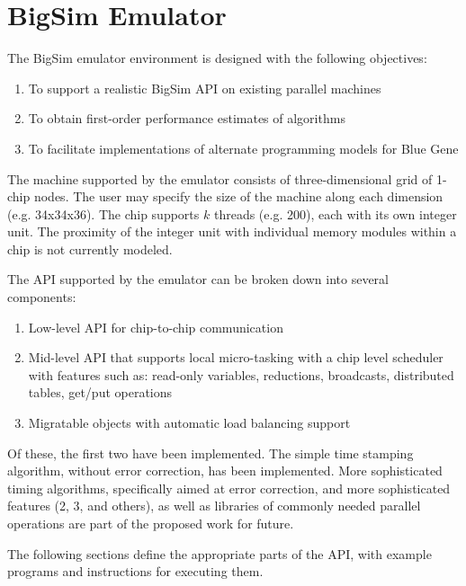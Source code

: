 
\section{BigSim Emulator}
\label{bgemulator}

The BigSim emulator environment is designed with the following
objectives:

\begin{enumerate}
\item To support a realistic BigSim API on existing parallel machines

\item To obtain first-order performance estimates of algorithms

\item To facilitate implementations of alternate programming models for
      Blue Gene
\end{enumerate}

The machine supported by the emulator consists of three-dimensional grid of
1-chip nodes.  The user may specify the size of the machine along each
dimension (e.g. 34x34x36).  The chip supports $k$ threads (e.g. 200), each with
its own integer unit.  The proximity of the integer unit with individual memory
modules within a chip is not currently modeled.

The API supported by the emulator can be broken down into several
components:

\begin{enumerate}
\item Low-level API for chip-to-chip communication
\item Mid-level API that supports local micro-tasking with a chip level
scheduler with features such as: read-only variables, reductions, broadcasts,
distributed tables, get/put operations
\item Migratable objects with automatic load balancing support
\end{enumerate}

Of these, the first two have been implemented.  The simple time stamping
algorithm, without error correction, has been implemented.  More
sophisticated timing algorithms, specifically aimed at error correction,
and more sophisticated features (2, 3, and others), as well as libraries
of commonly needed parallel operations are part of the proposed work for
future.

The following sections define the appropriate parts of the API, with
example programs and instructions for executing them.

